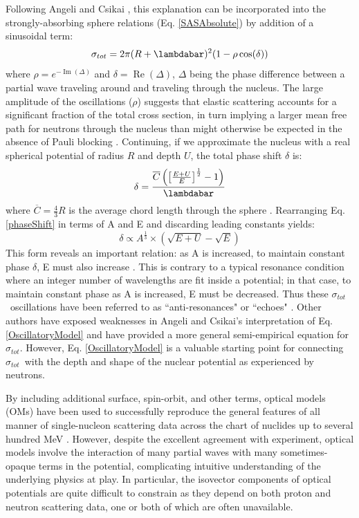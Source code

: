 \documentclass[twocolumn,secnumarabic,amssymb, nobibnotes, aps, prl,
superscriptaddress, nobalancelastpage]{revtex4}
\newcommand{\tot}{\ensuremath{\sigma_{tot}}}
\begin{document}
Following Angeli and Csikai \cite{Angeli1970}, this explanation can be
incorporated into the strongly-absorbing sphere relations (Eq. \ref{SASAbsolute}) 
by addition of a sinusoidal term:
\begin{equation} \label{OscillatoryModel}
    \tot = 2\pi (R+\lambdabar)^{2}(1 - \rho \cos(\delta))
\end{equation}
where $\rho = e^{-\operatorname{Im}(\Delta)}$ and $\delta =
\operatorname{Re}(\Delta)$, $\Delta$ being the phase difference between a
partial wave traveling
around and traveling through the nucleus. The large amplitude of the
oscillations ($\rho$) suggests that elastic scattering accounts for a
significant fraction of the total cross section, in turn implying a 
larger mean free path for neutrons through the nucleus 
than might otherwise be expected in the absence of Pauli blocking
\cite{Mohr1955}.
Continuing, if we approximate the nucleus with a
real spherical potential of radius $R$ and depth $U$, the total phase shift $\delta$ is:
\begin{equation} \label{phaseShift}
    \delta =
    \frac{\overline{C}\left(\left[{\frac{E+U}{E}}\right]^{\frac{1}{2}}-1\right)}{\lambdabar}
\end{equation}
where $\overline{C} = \frac{4}{3}R$ is the average chord length through the
sphere \cite{Angeli1970}. Rearranging Eq. \ref{phaseShift} in terms of A and E and
discarding leading constants yields:
\begin{equation}
    \delta \propto A^{\frac{1}{3}}\times\left(\sqrt{E+U}-\sqrt{E}\right)
\end{equation}
This form reveals an important relation: as A is increased, to maintain constant 
phase $\delta$, E must also increase \cite{Satchler1980, Peterson1962}. 
This is contrary to a typical resonance condition where an integer number of wavelengths
are fit inside a potential; in that case, to maintain constant phase as A is increased,
E must be decreased. Thus these \tot\ oscillations have been referred to as
``anti-resonances" or ``echoes" \cite{Satchler1980, McVoy1967}.
Other authors \cite{Ahmad1973} have
exposed weaknesses in Angeli and Csikai's interpretation of
Eq. \ref{OscillatoryModel} and have provided a more general semi-empirical
equation for \tot. However, Eq. \ref{OscillatoryModel} is a valuable starting
point for connecting \tot\ with the depth and shape of the nuclear
potential as experienced by neutrons.

By including additional surface, spin-orbit, and other terms, optical models (OMs) have been 
used to successfully reproduce the general features of all manner of single-nucleon scattering 
data across the chart of nuclides up to several hundred MeV \cite{Perey1976,
CH89, KoningDelaroche}. However, despite the excellent agreement with experiment, optical models
involve the interaction of many partial waves with many sometimes-opaque terms
in the potential, complicating intuitive understanding of the underlying
physics at play. In particular, the isovector components of optical potentials
are quite difficult to constrain as they depend on both proton and neutron 
scattering data, one or both of which are often unavailable.
\end{document}
